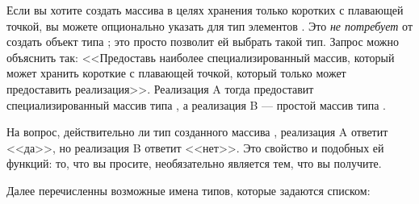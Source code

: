 Если вы хотите создать массива в целях хранения только коротких с плавающей
точкой, вы можете опционально указать для  тип элементов
. Это \emph{не потребует} от  создать объект типа
; это просто позволит ей выбрать такой тип. Запрос
можно объяснить так: <<Предоставь наиболее специализированный массив, который
может хранить короткие с плавающей точкой, который только может предоставить
реализация>>. Реализация A тогда предоставит специализированный массив типа
, а реализация B --- простой массив типа .

На вопрос, действительно ли тип созданного массива ,
реализация A ответит <<да>>, но реализация B ответит <<нет>>. Это свойство
 и подобных ей функций: то, что вы просите, необязательно
является тем, что вы получите.

Далее перечисленны возможные имена типов, которые задаются списком:

